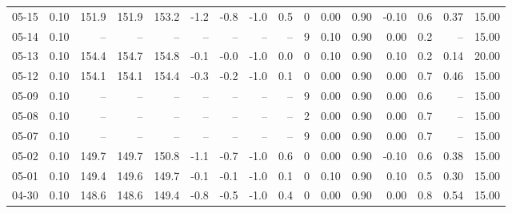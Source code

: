 \begin{threeparttable}
{\begin{tabular}{lrrrrrrrrrrrrrrr}
  05-15 &     0.10 & 151.9 & 151.9 & 153.2 &       -1.2 &           -0.8 &                     -1.0 &                 0.5 &              0 &       0.00 &      0.90 &          -0.10 &              0.6 &            0.37 &                  15.00 \\
  05-14 &     0.10 &    -- &    -- &    -- &         -- &             -- &                       -- &                  -- &              9 &       0.10 &      0.90 &           0.00 &              0.2 &              -- &                  15.00 \\
  05-13 &     0.10 & 154.4 & 154.7 & 154.8 &       -0.1 &           -0.0 &                     -1.0 &                 0.0 &              0 &       0.10 &      0.90 &           0.10 &              0.2 &            0.14 &                  20.00 \\
  05-12 &     0.10 & 154.1 & 154.1 & 154.4 &       -0.3 &           -0.2 &                     -1.0 &                 0.1 &              0 &       0.00 &      0.90 &           0.00 &              0.7 &            0.46 &                  15.00 \\
  05-09 &     0.10 &    -- &    -- &    -- &         -- &             -- &                       -- &                  -- &              9 &       0.00 &      0.90 &           0.00 &              0.6 &              -- &                  15.00 \\
  05-08 &     0.10 &    -- &    -- &    -- &         -- &             -- &                       -- &                  -- &              2 &       0.00 &      0.90 &           0.00 &              0.7 &              -- &                  15.00 \\
  05-07 &     0.10 &    -- &    -- &    -- &         -- &             -- &                       -- &                  -- &              9 &       0.00 &      0.90 &           0.00 &              0.7 &              -- &                  15.00 \\
  05-02 &     0.10 & 149.7 & 149.7 & 150.8 &       -1.1 &           -0.7 &                     -1.0 &                 0.6 &              0 &       0.00 &      0.90 &          -0.10 &              0.6 &            0.38 &                  15.00 \\
  05-01 &     0.10 & 149.4 & 149.6 & 149.7 &       -0.1 &           -0.1 &                     -1.0 &                 0.1 &              0 &       0.10 &      0.90 &           0.10 &              0.5 &            0.30 &                  15.00 \\
  04-30 &     0.10 & 148.6 & 148.6 & 149.4 &       -0.8 &           -0.5 &                     -1.0 &                 0.4 &              0 &       0.00 &      0.90 &           0.00 &              0.8 &            0.54 &                  15.00 \\

\end{tabular}}
\end{threeparttable}
